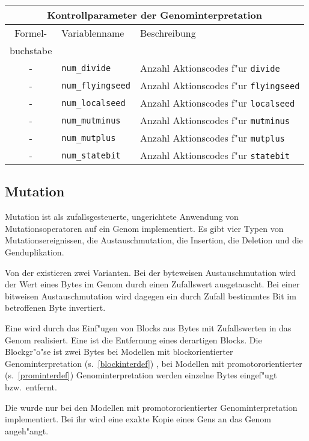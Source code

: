 \medskip
\noindent\begin{tabularx}{\linewidth}{|c|l|X|} \hline
\multicolumn{3}{|c|}{\bfseries Kontrollparameter der Genominterpretation} \\ \hline
Formel- & Variablenname & Beschreibung \\
buchstabe &              & \\ \hline
- & \verb|num_divide|     & Anzahl Aktionscodes f"ur \verb|divide| \\
- & \verb|num_flyingseed| & Anzahl Aktionscodes f"ur \verb|flyingseed| \\
- & \verb|num_localseed|  & Anzahl Aktionscodes f"ur \verb|localseed| \\
- & \verb|num_mutminus|   & Anzahl Aktionscodes f"ur \verb|mutminus| \\
- & \verb|num_mutplus|    & Anzahl Aktionscodes f"ur \verb|mutplus| \\
- & \verb|num_statebit|   & Anzahl Aktionscodes f"ur \verb|statebit| \\ \hline
\end{tabularx}
\medskip


\subsection{Mutation}
\label{mutationdef}

Mutation ist als zufallsgesteuerte, ungerichtete Anwendung von Mutationsoperatoren
auf ein Genom implementiert. Es gibt vier Typen von Mutationsereignissen,
die Austauschmutation, die Insertion, die Deletion und die Genduplikation.

Von der  existieren zwei Varianten. Bei der byteweisen
Austauschmutation wird der Wert eines Bytes im Genom durch einen Zufallswert
ausgetauscht. Bei einer bitweisen Austauschmutation wird dagegen ein durch Zufall
bestimmtes Bit im betroffenen Byte invertiert.

Eine  wird durch das Einf"ugen von Blocks aus Bytes
mit Zufallswerten in das Genom realisiert. Eine  ist
die Entfernung eines derartigen Blocks. Die Blockgr"o"se ist zwei
Bytes bei Modellen mit blockorientierter Genominterpretation (s.\ \ref{blockinterdef}) , bei
Modellen mit promotororientierter (s.\ \ref{prominterdef}) Genominterpretation werden einzelne Bytes
eingef"ugt bzw.\ entfernt.

Die  wurde nur bei den Modellen mit promotororientierter
Genominterpretation implementiert. Bei ihr
wird eine exakte Kopie eines Gens an das Genom angeh"angt.

